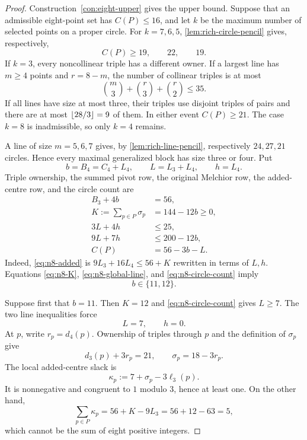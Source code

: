 \begin{proof}
Construction~\ref{con:eight-upper} gives the upper bound.  Suppose that an
admissible eight-point set has $C(P)\leq16$, and let $k$ be the maximum
number of selected points on a proper circle.  For $k=7,6,5$,
\cref{lem:rich-circle-pencil} gives, respectively,
\[
 C(P)\geq19,\qquad22,\qquad19.
\]
If $k=3$, every noncollinear triple has a different owner.  If a largest
line has $m\geq4$ points and $r=8-m$, the number of collinear triples is at
most
\[
 \binom m3+\binom r3+\binom r2\leq35.
\]
If all lines have size at most three, their triples use disjoint triples of
pairs and there are at most $\left\lfloor 28/3\right\rfloor=9$ of them.  In either event
$C(P)\geq21$.  The case $k=8$ is inadmissible, so only $k=4$ remains.

A line of size $m=5,6,7$ gives, by
\cref{lem:rich-line-pencil}, respectively $24,27,21$ circles.  Hence every
maximal generalized block has size three or four.  Put
\[
 b=B_4=C_4+L_4,\qquad
 L=L_3+L_4,\qquad h=L_4.
\]
Triple ownership, the summed pivot row, the original Melchior row, the
added-centre row, and the circle count are
\begin{align}
 B_3+4b&=56,                                         \label{eq:n8-triples}\\
 K:=\sum_{p\in P}\sigma_p&=144-12b\geq0,             \label{eq:n8-K}\\
 3L+4h&\leq25,                                       \label{eq:n8-global-line}\\
 9L+7h&\leq200-12b,                                  \label{eq:n8-added}\\
 C(P)&=56-3b-L.                                      \label{eq:n8-circle-count}
\end{align}
Indeed, \eqref{eq:n8-added} is
$9L_3+16L_4\leq56+K$ rewritten in terms of $L,h$.
Equations \eqref{eq:n8-K}, \eqref{eq:n8-global-line}, and
\eqref{eq:n8-circle-count} imply
\begin{equation}\label{eq:n8-b-range}
 b\in\{11,12\}.
\end{equation}

Suppose first that $b=11$.  Then $K=12$ and
\eqref{eq:n8-circle-count} gives $L\geq7$.  The two line inequalities force
\[
 L=7,\qquad h=0.
\]
At $p$, write $r_p=d_4(p)$.  Ownership of triples through $p$ and the
definition of $\sigma_p$ give
\[
 d_3(p)+3r_p=21,\qquad \sigma_p=18-3r_p.
\]
The local added-centre slack is
\[
 \kappa_p:=7+\sigma_p-3\ell_3(p).
\]
It is nonnegative and congruent to $1$ modulo $3$, hence at least one.
On the other hand,
\[
 \sum_{p\in P}\kappa_p=56+K-9L_3=56+12-63=5,
\]
which cannot be the sum of eight positive integers.


\end{proof}
